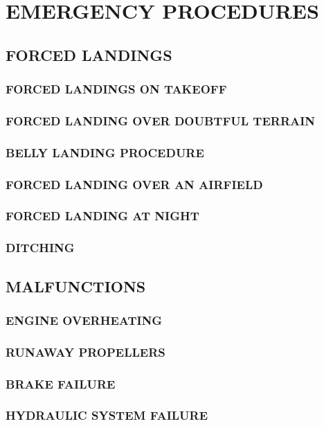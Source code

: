 \chapter{EMERGENCY PROCEDURES}
\minitoc{}
\cleardoublepage{}


\section{FORCED LANDINGS}
\subsection{FORCED LANDINGS ON TAKEOFF}
\subsection{FORCED LANDING OVER DOUBTFUL TERRAIN}
\subsection{BELLY LANDING PROCEDURE}
\subsection{FORCED LANDING OVER AN AIRFIELD}
\subsection{FORCED LANDING AT NIGHT}
\subsection{DITCHING}


\section{MALFUNCTIONS}
\subsection{ENGINE OVERHEATING}
\subsection{RUNAWAY PROPELLERS}
\subsection{BRAKE FAILURE}
\subsection{HYDRAULIC SYSTEM FAILURE}
